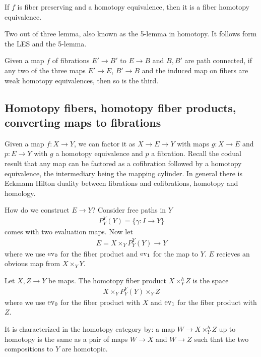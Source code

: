 \documentclass[12pt]{article}
\begin{document}
    \begin{proposition}
        If $f$ is fiber preserving and a homotopy equivalence, then it is a fiber homotopy equivalence.
    \end{proposition}

    Two out of three lemma, also known as the 5-lemma in homotopy. It follows form the LES and the 5-lemma.
    \begin{lemma}
        Given a map $f$ of fibrations $E'\to B'$ to $E\to B$ and $B,B'$ are path connected, if any two of the three maps $E' \to E$, $B' \to B$ and the induced map on fibers are weak homotopy equivalences, then so is the third.
    \end{lemma}

    \subsection{Homotopy fibers, homotopy fiber products, converting maps to fibrations}
    Given a map $f: X \to Y$, we can factor it as $X \to E \to Y$ with maps $g:X \to E$ and $p: E \to Y$ with $g$ a homotopy equivalence and $p$ a fibration. Recall the codual result that any map can be factored as a cofibration followed by a homotopy equivalence, the intermediary being the mapping cylinder. In general there is Eckmann Hilton duality between fibrations and cofibrations, homotopy and homology. 

    How do we construct $E\to Y$? Consider free paths in $Y$ \begin{align*}
        P_Y^Y(Y) = \{\gamma: I \to Y \}
    \end{align*} comes with two evaluation maps. Now let \begin{align*}
        E = X \times_Y P_Y^Y(Y) \to Y
    \end{align*} where we use $\operatorname{ev}_0$ for the fiber product and $\operatorname{ev}_1$ for the map to $Y$. $E$ recieves an obvious map from $X \times_Y Y$. 

    \begin{definition}
        Let $X,Z \to Y$ be maps. The homotopy fiber product $X \times^h_Y Z$ is the space \begin{align*}
            X \times_Y P_Y^Y(Y) \times_Y Z 
        \end{align*} where we use $\operatorname{ev}_0$ for the fiber product with $X$ and $\operatorname{ev}_1$ for the fiber product with $Z$. 
    \end{definition}
    It is characterized in the homotopy category by: a map $W \to X \times^h_Y Z$ up to homotopy is the same as a pair of maps $W \to X$ and $W \to Z$ such that the two compositions to $Y$ are homotopic.
\end{document}
